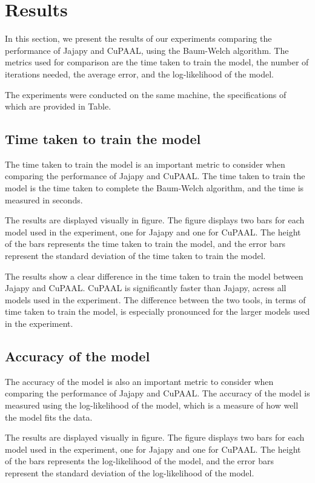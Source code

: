 \section{Results}\label{sec:results}
In this section, we present the results of our experiments comparing the performance of Jajapy and CuPAAL, using the Baum-Welch algorithm.
The metrics used for comparison are the time taken to train the model, the number of iterations needed, the average error, and the log-likelihood of the model.

The experiments were conducted on the same machine, the specifications of which are provided in Table.

\subsection{Time taken to train the model}\label{subsec:results_time}
The time taken to train the model is an important metric to consider when comparing the performance of Jajapy and CuPAAL.
The time taken to train the model is the time taken to complete the Baum-Welch algorithm, and the time is measured in seconds.

The results are displayed visually in figure.
The figure displays two bars for each model used in the experiment, one for Jajapy and one for CuPAAL.
The height of the bars represents the time taken to train the model, and the error bars represent the standard deviation of the time taken to train the model.

The results show a clear difference in the time taken to train the model between Jajapy and CuPAAL.
CuPAAL is significantly faster than Jajapy, acress all models used in the experiment.
The difference between the two tools, in terms of time taken to train the model, is especially pronounced for the larger models used in the experiment.


\subsection{Accuracy of the model}\label{subsec:results_accuracy}
The accuracy of the model is also an important metric to consider when comparing the performance of Jajapy and CuPAAL.
The accuracy of the model is measured using the log-likelihood of the model, which is a measure of how well the model fits the data.

The results are displayed visually in figure.
The figure displays two bars for each model used in the experiment, one for Jajapy and one for CuPAAL.
The height of the bars represents the log-likelihood of the model, and the error bars represent the standard deviation of the log-likelihood of the model.

